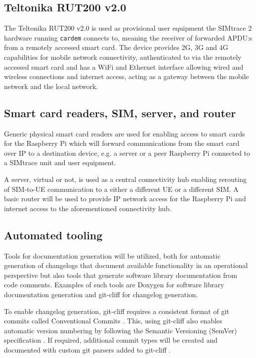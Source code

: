 \subsection{Teltonika RUT200 v2.0}

The Teltonika RUT200 v2.0 is used as provisional user equipment
the SIMtrace 2 hardware running \verb|cardem| connects to, meaning
the receiver of forwarded APDU:s from a remotely accessed smart
card. The device provides 2G, 3G and 4G capabilities for mobile
network connectivity, authenticated to via the remotely accessed
smart card and has a WiFi and Ethernet interface allowing wired
and wireless connections and internet access, acting as a gateway
between the mobile network and the local network.

\subsection{Smart card readers, SIM, server, and router}

Generic physical smart card readers are used for enabling access to
smart cards for the Raspberry Pi which will forward communications
from the smart card over IP to a destination device, e.g. a server
or a peer Raspberry Pi connected to a SIMtrace unit and user
equipment.

A server, virtual or not, is used as a central connectivity hub
enabling rerouting of SIM-to-UE communication to a either a
different UE or a different SIM. A basic router will be used to
provide IP network access for the Raspberry Pi and internet access
to the aforementioned connectivity hub.

\subsection{Automated tooling}

Tools for documentation generation will be utilized, both for
automatic generation of changelogs that document available
functionality in an operational perspective but also tools that
generate software library documentation from code comments.
Examples of such tools are Doxygen \cite{doxygen} for software
library documentation generation and git-cliff \cite{git-cliff} for
changelog generation.

To enable changelog generation, git-cliff requires a consistent
format of git commits \cite{git-cliff} called Conventional Commits
\cite{conventional-commits}. This, using git-cliff also enables
automatic version numbering \cite{git-cliff-bump-version} by
following the Semantic Versioning (SemVer) specification
\cite{semver}. If required, additional commit types will be created
and documented with custom git parsers added to git-cliff \cite{git-cliff-tips-and-tricks}.

